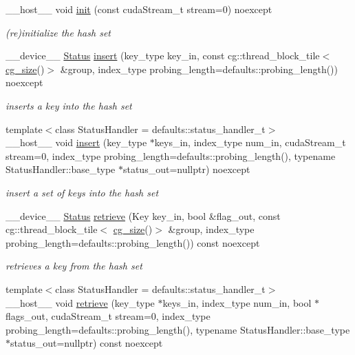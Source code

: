 \begin{DoxyCompactItemize}
\+\_\+\+\_\+host\+\_\+\+\_\+ void \hyperlink{classwarpcore_1_1HashSet_ae21bfb96f28d7b097841d6a6874c16d5}{init} (const cuda\+Stream\+\_\+t stream=0) noexcept
\begin{DoxyCompactList}\small\item\em (re)initialize the hash set \end{DoxyCompactList}\item 
\+\_\+\+\_\+device\+\_\+\+\_\+ \hyperlink{classwarpcore_1_1Status}{Status} \hyperlink{classwarpcore_1_1HashSet_af54d9aecfefb13e451e0580a38702f54}{insert} (key\+\_\+type key\+\_\+in, const cg\+::thread\+\_\+block\+\_\+tile$<$ \hyperlink{classwarpcore_1_1HashSet_a0906259ae0be4a4f6f9ba74b4874e542}{cg\+\_\+size}()$>$ \&group, index\+\_\+type probing\+\_\+length=defaults\+::probing\+\_\+length()) noexcept
\begin{DoxyCompactList}\small\item\em inserts a key into the hash set \end{DoxyCompactList}\item 
{\footnotesize template$<$class Status\+Handler  = defaults\+::status\+\_\+handler\+\_\+t$>$ }\\\+\_\+\+\_\+host\+\_\+\+\_\+ void \hyperlink{classwarpcore_1_1HashSet_aa5f8752a439792aa532d04abb50b0f26}{insert} (key\+\_\+type $\ast$keys\+\_\+in, index\+\_\+type num\+\_\+in, cuda\+Stream\+\_\+t stream=0, index\+\_\+type probing\+\_\+length=defaults\+::probing\+\_\+length(), typename Status\+Handler\+::base\+\_\+type $\ast$status\+\_\+out=nullptr) noexcept
\begin{DoxyCompactList}\small\item\em insert a set of keys into the hash set \end{DoxyCompactList}\item 
\+\_\+\+\_\+device\+\_\+\+\_\+ \hyperlink{classwarpcore_1_1Status}{Status} \hyperlink{classwarpcore_1_1HashSet_a3be33bdea6aabe4075b7e6f9a3741021}{retrieve} (Key key\+\_\+in, bool \&flag\+\_\+out, const cg\+::thread\+\_\+block\+\_\+tile$<$ \hyperlink{classwarpcore_1_1HashSet_a0906259ae0be4a4f6f9ba74b4874e542}{cg\+\_\+size}()$>$ \&group, index\+\_\+type probing\+\_\+length=defaults\+::probing\+\_\+length()) const noexcept
\begin{DoxyCompactList}\small\item\em retrieves a key from the hash set \end{DoxyCompactList}\item 
{\footnotesize template$<$class Status\+Handler  = defaults\+::status\+\_\+handler\+\_\+t$>$ }\\\+\_\+\+\_\+host\+\_\+\+\_\+ void \hyperlink{classwarpcore_1_1HashSet_a0012b8162ac192387bafc44bc773f70a}{retrieve} (key\+\_\+type $\ast$keys\+\_\+in, index\+\_\+type num\+\_\+in, bool $\ast$flags\+\_\+out, cuda\+Stream\+\_\+t stream=0, index\+\_\+type probing\+\_\+length=defaults\+::probing\+\_\+length(), typename Status\+Handler\+::base\+\_\+type $\ast$status\+\_\+out=nullptr) const noexcept

\end{DoxyCompactItemize}
